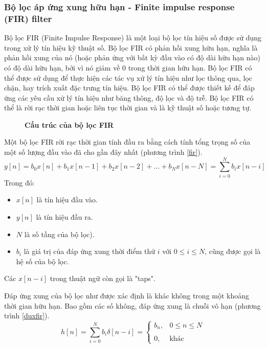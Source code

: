 \subsubsection{Bộ lọc áp ứng xung hữu hạn -  Finite impulse response (FIR) filter}
Bộ lọc FIR (Finite Impulse Response) là một loại bộ lọc tín hiệu số được sử dụng trong xử lý tín hiệu kỹ thuật số. Bộ lọc FIR có phản hồi xung hữu hạn, nghĩa là phản hồi xung của nó (hoặc phản ứng với bất kỳ đầu vào có độ dài hữu hạn nào) có độ dài hữu hạn, bởi vì nó giảm về 0 trong thời gian hữu hạn. Bộ lọc FIR có thể được sử dụng để thực hiện các tác vụ xử lý tín hiệu như lọc thông qua, lọc chặn, hay trích xuất đặc trưng tín hiệu. Bộ lọc FIR có thể được thiết kế để đáp ứng các yêu cầu xử lý tín hiệu như băng thông, độ lọc và độ trễ. Bộ lọc FIR có thể là rời rạc thời gian hoặc liên tục thời gian và là kỹ thuật số hoặc tương tự. \cite{8256573}
\begin{figure}[H]
    \centering
    
    \caption[Cấu trúc của bộ lọc FIR]{\bfseries \fontsize{12pt}{0pt}\selectfont Cấu trúc của bộ lọc FIR}
    \label{FIR_Filter}
\end{figure}
Một bộ lọc FIR rời rạc thời gian tính đầu ra bằng cách tính tổng trọng số của một số lượng đầu vào đã cho gần đây nhất (phương trình \ref{fir}).
\begin{equation}\label{fir}
       y[n]= b_0x[n] + b_1x[n-1] + b_2x[n-2] + ... + b_Nx[n-N] = \sum^{N}_{i=0}b_ix[n - i]
\end{equation}
Trong đó:
\begin{itemize}
  \item $x[n]$ là tín hiệu đầu vào.
  \item $y[n]$ là tín hiệu đầu ra.
  \item $N$ là số tầng của bộ lọc).
  \item $b_i$ là giá trị của đáp ứng xung thời điểm thứ $i$ với $0 \leq i \leq N$, cũng được gọi là hệ số của bộ lọc.
\end{itemize}

Các $x[n-i]$ trong thuật ngữ còn gọi là "taps". 

Đáp ứng xung của bộ lọc như được xác định là khác không trong một khoảng thời gian hữu hạn. Bao gồm các số không, đáp ứng xung là chuỗi vô hạn (phương trình \ref{duxfir}).
\begin{equation}\label{duxfir}
    h[n] = \sum ^{N}_{i=0}b_i\delta[n-i]=\left\{\begin{matrix}b_n,& 0 \leq n \leq N
    \\&
\\ 0, & \text{khác}
\end{matrix}\right.
\end{equation}

